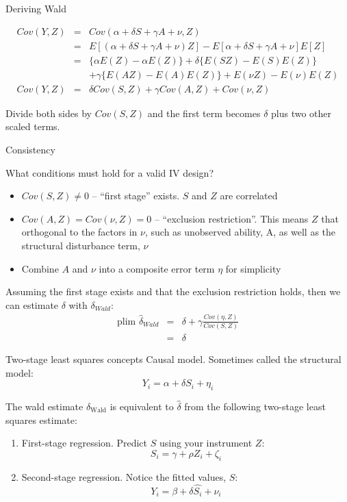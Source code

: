 \documentclass{beamer}
\begin{document}
\begin{frame}{Deriving Wald}

  \begin{eqnarray*}
    Cov(Y,Z)  &=& Cov(\alpha + \delta{S} + \gamma{A} + \nu, Z) \\
    &=& E[(\alpha + \delta{S} + \gamma{A} + \nu)  Z] - E[\alpha + \delta{S} + \gamma{A} + \nu]E[Z] \\
    &=& \{\alpha E(Z) - \alpha E(Z) \} + \delta \{ E(SZ) - E(S)E(Z)\} \\
    && + \gamma \{E(AZ) - E(A)E(Z) \} + E(\nu Z) - E(\nu)E(Z) \\
    Cov(Y,Z)  &=& \delta Cov(S,Z) + \gamma Cov(A,Z) + Cov(\nu,Z)
  \end{eqnarray*}

  \bigskip
  Divide both sides by $Cov(S,Z)$ and the first term becomes $\delta$ plus two other scaled terms.
\end{frame}

\begin{frame}{Consistency}

  What conditions must hold for a valid IV design?
  \begin{itemize}

    \item  $Cov(S,Z)\neq{0}$ -- ``first stage'' exists.  $S$ and $Z$ are correlated
    \item $Cov(A,Z)=Cov(\nu ,Z)=0$ -- ``exclusion restriction''.  This means $Z$ that orthogonal to the factors in $\nu$, such as unobserved ability, A, as well as the structural disturbance term, $\nu$
    \item Combine $A$ and $\nu$ into a composite error term $\eta$ for simplicity
  \end{itemize}

  Assuming the first stage exists and that the exclusion restriction holds, then we can estimate $\delta$ with $\delta_{Wald}$:
  \begin{eqnarray*}
    \text{plim }\widehat{\delta}_{Wald}&=& \delta + \gamma \frac{Cov(\eta,Z)}{Cov(S,Z)} \\
    &=&\delta
  \end{eqnarray*}
\end{frame}

\begin{frame}{Two-stage least squares concepts}
  Causal model.  Sometimes called the structural model:
  $$Y_i=\alpha + \delta{S_i} + \eta_i$$

  The wald estimate $\hat{\delta}_{\text{Wald}}$ is equivalent to $\hat{\delta}$ from the following two-stage least squares estimate:

  \begin{enumerate}
    \item First-stage regression. Predict $S$ using your instrument $Z$:
          $$S_i = \gamma + \rho{Z_i} + \zeta_i$$

    \item Second-stage regression. Notice the fitted values, $\widehat{S}$:
          $$Y_i=\beta + \delta{\widehat{S_i}}+\nu_i$$
  \end{enumerate}
\end{frame}
\end{document}
